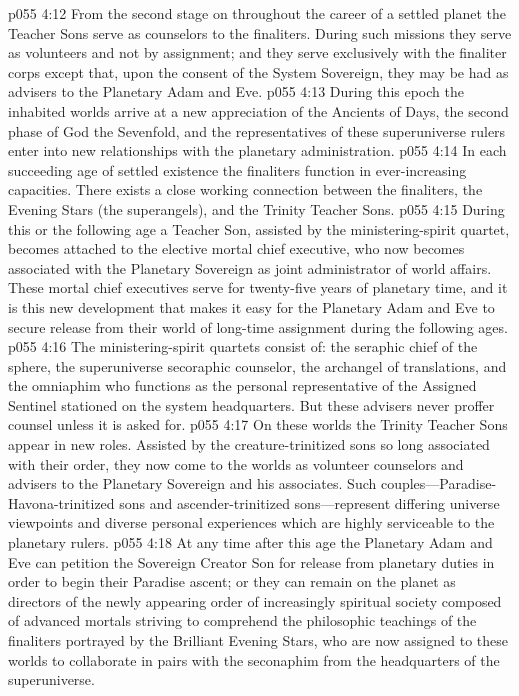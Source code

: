 \vs p055 4:12 From the second stage on throughout the career of a settled planet the Teacher Sons serve as counselors to the finaliters. During such missions they serve as volunteers and not by assignment; and they serve exclusively with the finaliter corps except that, upon the consent of the System Sovereign, they may be had as advisers to the Planetary Adam and Eve.
\pc \vs p055 4:13 \bibnobreakspace {} During this epoch the inhabited worlds arrive at a new appreciation of the Ancients of Days, the second phase of God the Sevenfold, and the representatives of these superuniverse rulers enter into new relationships with the planetary administration.
\vs p055 4:14 In each succeeding age of settled existence the finaliters function in ever\hyp{}increasing capacities. There exists a close working connection between the finaliters, the Evening Stars (the superangels), and the Trinity Teacher Sons.
\vs p055 4:15 During this or the following age a Teacher Son, assisted by the ministering\hyp{}spirit quartet, becomes attached to the elective mortal chief executive, who now becomes associated with the Planetary Sovereign as joint administrator of world affairs. These mortal chief executives serve for twenty\hyp{}five years of planetary time, and it is this new development that makes it easy for the Planetary Adam and Eve to secure release from their world of long\hyp{}time assignment during the following ages.
\vs p055 4:16 The ministering\hyp{}spirit quartets consist of: the seraphic chief of the sphere, the superuniverse secoraphic counselor, the archangel of translations, and the omniaphim who functions as the personal representative of the Assigned Sentinel stationed on the system headquarters. But these advisers never proffer counsel unless it is asked for.
\vs p055 4:17 \bibnobreakspace {} On these worlds the Trinity Teacher Sons appear in new roles. Assisted by the creature\hyp{}trinitized sons so long associated with their order, they now come to the worlds as volunteer counselors and advisers to the Planetary Sovereign and his associates. Such couples---Paradise\hyp{}Havona\hyp{}trinitized sons and ascender\hyp{}trinitized sons---represent differing universe viewpoints and diverse personal experiences which are highly serviceable to the planetary rulers.
\vs p055 4:18 At any time after this age the Planetary Adam and Eve can petition the Sovereign Creator Son for release from planetary duties in order to begin their Paradise ascent; or they can remain on the planet as directors of the newly appearing order of increasingly spiritual society composed of advanced mortals striving to comprehend the philosophic teachings of the finaliters portrayed by the Brilliant Evening Stars, who are now assigned to these worlds to collaborate in pairs with the seconaphim from the headquarters of the superuniverse.
